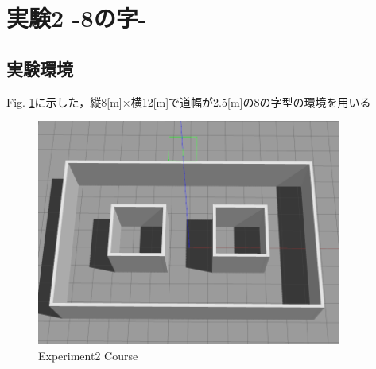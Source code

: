 \newpage
\section{実験2 -8の字-}
\subsection{実験環境}
Fig. \ref{fig::hatinozi}に示した，縦8[m]×横12[m]で道幅が2.5[m]の8の字型の環境を用いる
\begin{figure}[h]
    \centering
    \includegraphics[width = 10cm]{./figs/coli.png}
    \caption{Experiment2 Course}
    \label{fig::hatinozi}
\end{figure}

